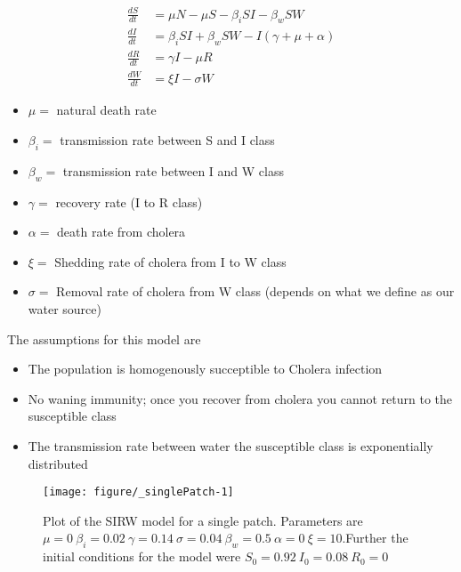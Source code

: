 \documentclass[12pt]{article}\usepackage[]{graphicx}\usepackage[]{color}
\makeatletter
\def\maxwidth{ %
  \ifdim\Gin@nat@width>\linewidth
    \linewidth
  \else
    \Gin@nat@width
  \fi
}
\newenvironment{knitrout}{}{} %
\makeatother
\begin{document}
\begin{linenomath}
	\begin{align*}
		\frac{dS}{dt}&= \mu N - \mu S - \beta_i SI - \beta_w S W  \\
		\frac{dI}{dt}&= \beta_i S I + \beta_w S W - I (\gamma + \mu + \alpha) \\
		\frac{dR}{dt}&= \gamma I - \mu R \\
		\frac{dW}{dt}&= \xi I  - \sigma W
	\end{align*}
\end{linenomath}
\begin{itemize}
    \item$\mu=$ natural death rate
    \item$\beta_i=$ transmission rate between S and I class
    \item$\beta_w=$ transmission rate between I and W class
    \item$\gamma=$ recovery rate (I to R class)
    \item$\alpha=$ death rate from cholera
    \item$\xi=$ Shedding rate of cholera from I to W class
    \item$\sigma=$	Removal rate of cholera from W class (depends on what we define as our water source)
\end{itemize}
The assumptions for this model are
\begin{itemize}
    \item The population is homogenously succeptible to Cholera infection
    \item No waning immunity; once you recover from cholera you cannot return to the susceptible class
    \item The transmission rate between water the susceptible class  is exponentially distributed
\end{itemize}

\begin{knitrout}
\color{fgcolor}\begin{figure}[h]
\texttt{[image: figure/\_singlePatch-1]} \caption{\label{fig:singlepatch} Plot of the SIRW model for a single patch. Parameters are $\mu=0\ \beta_i=0.02\ \gamma=0.14\ \sigma=0.04\ \beta_w=0.5\ \alpha=0\ \xi=10$.Further the initial conditions for the model were $S_0=0.92\ I_0=0.08\ R_0=0$}\label{fig:<singlePatch}
\end{figure}


\end{knitrout}
\FloatBarrier
\end{document}
